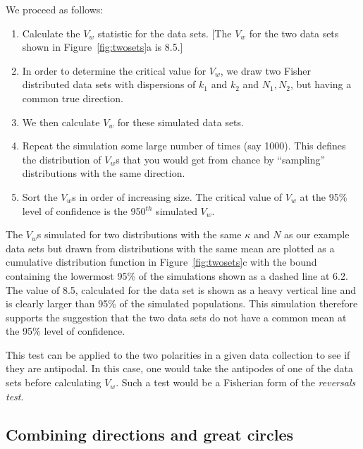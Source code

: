 We proceed as follows:

\begin{enumerate}
\item Calculate the $V_w$ statistic for the data sets.  [The  $V_w$
for the two data sets shown in  Figure~\ref{fig:twosets}a is  8.5.]

\item In
order to determine the critical value for $V_w$, we draw two Fisher distributed data sets with
dispersions of $k_1$ and $k_2$ and $N_1, N_2$, but having  a common true direction.  

\item We then calculate
$V_w$ for these simulated data sets.

\item   Repeat  the simulation some large number of  times (say 1000).   This defines the distribution of $V_w$s that you would get from chance by ``sampling''   distributions with the same direction.  

\item Sort the $V_w$s in order of increasing size.  The critical value of $V_w$ at the 95\% level of confidence is the 950$^{th}$ simulated $V_w$.  
\end{enumerate}

 The $V_w$s simulated for two distributions with the same $\kappa$ and $N$  as our  example data sets but drawn from distributions with the same mean are
plotted as a cumulative distribution function in Figure~\ref{fig:twosets}c with the bound containing the lowermost 95\%  of the  simulations shown
as a dashed line at 6.2.  The value of 8.5, calculated for the data set  is shown as a heavy vertical line 
and is clearly larger than  95\% of the simulated populations. This simulation
therefore supports the suggestion  that the two data sets do not have a common mean at the 95\% level of confidence.    

This test can be applied to the two polarities in a given data collection to see if they are antipodal.  In this case, one would take the antipodes of one of the data sets before calculating $V_w$.  
Such a  test would be  a Fisherian form of the {\it reversals test}.





\subsection {Combining directions and great circles}


